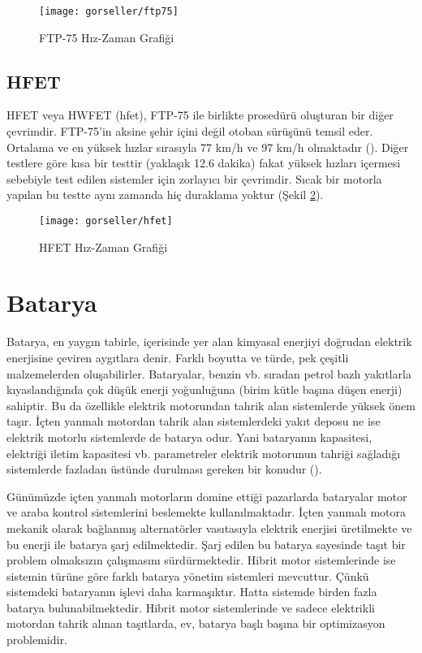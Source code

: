 \begin{figure}[h]
    \centering
    \texttt{[image: gorseller/ftp75]}
    \caption{FTP-75 Hız-Zaman Grafiği}\label{fig:ftp75}
\end{figure}

\subsection{HFET}
\label{hfetsubsec}
HFET veya HWFET (\acrlong{hfet}), FTP-75 ile birlikte prosedürü oluşturan bir diğer çevrimdir. FTP-75'in aksine şehir içini değil otoban sürüşünü temsil eder.  Ortalama ve en yüksek hızlar sırasıyla 77 km/h ve 97 km/h olmaktadır (\cite{hfetnedir}). Diğer testlere göre kısa bir testtir (yaklaşık 12.6 dakika) fakat yüksek hızları içermesi sebebiyle 
test edilen sistemler için zorlayıcı bir çevrimdir. Sıcak bir motorla yapılan bu testte aynı zamanda hiç duraklama yoktur (Şekil \ref{fig:hfet}).

\begin{figure}[h]
    \centering
    \texttt{[image: gorseller/hfet]}
    \caption{HFET Hız-Zaman Grafiği}\label{fig:hfet}
\end{figure}

\section{Batarya}
\label{bataryasection}
Batarya, en yaygın tabirle, içerisinde yer alan kimyasal enerjiyi doğrudan elektrik enerjisine çeviren aygıtlara denir. Farklı boyutta ve türde, pek çeşitli malzemelerden oluşabilirler. 
Bataryalar, benzin vb. sıradan petrol bazlı yakıtlarla kıyaslandığında çok düşük enerji yoğunluğuna (birim kütle başına düşen enerji) sahiptir. Bu da özellikle elektrik motorundan tahrik alan sistemlerde 
yüksek önem taşır. İçten yanmalı motordan tahrik alan sistemlerdeki yakıt deposu ne ise elektrik motorlu sistemlerde de batarya odur. Yani bataryanın kapasitesi, elektriği iletim kapasitesi vb. parametreler elektrik motorunun 
tahriği sağladığı sistemlerde fazladan üstünde durulması gereken bir konudur (\cite{bataryanedir}). 

Günümüzde içten yanmalı motorların domine ettiği pazarlarda bataryalar motor ve araba kontrol sistemlerini beslemekte kullanılmaktadır.
İçten yanmalı motora mekanik olarak bağlanmış alternatörler vasıtasıyla elektrik enerjisi üretilmekte ve bu enerji ile batarya şarj edilmektedir. Şarj edilen bu batarya sayesinde taşıt bir problem olmaksızın
çalışmasını sürdürmektedir. Hibrit motor sistemlerinde ise sistemin türüne göre farklı batarya yönetim sistemleri mevcuttur. Çünkü sistemdeki bataryanın işlevi daha karmaşıktır. Hatta 
sistemde birden fazla batarya bulunabilmektedir. Hibrit motor sistemlerinde ve sadece elektrikli motordan tahrik alınan taşıtlarda, \acrfull{ev}, batarya başlı başına bir optimizasyon problemidir.


